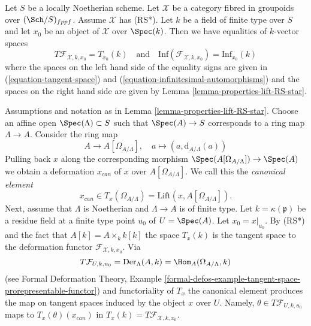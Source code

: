 \begin{remark}
\label{remark-compare-deformation-spaces}
Let $S$ be a locally Noetherian scheme. Let $\mathcal{X}$ be a category fibred
in groupoids over $(\Sch/S)_{fppf}$. Assume $\mathcal{X}$ has (RS*).
Let $k$ be a field of finite type over $S$ and let $x_0$ be an object of
$\mathcal{X}$ over $\Spec(k)$. Then we have equalities of
$k$-vector spaces
$$
T\mathcal{F}_{\mathcal{X}, k, x_0} = T_{x_0}(k)
\quad\text{and}\quad
\text{Inf}(\mathcal{F}_{\mathcal{X}, k, x_0}) =
\text{Inf}_{x_0}(k)
$$
where the spaces on the left hand side of the equality signs are
given in (\ref{equation-tangent-space}) and
(\ref{equation-infinitesimal-automorphisms})
and the spaces on the right hand side are given by
Lemma \ref{lemma-properties-lift-RS-star}.
\end{remark}

\begin{remark}
\label{remark-canonical-element}
Assumptions and notation as in Lemma \ref{lemma-properties-lift-RS-star}.
Choose an affine open $\Spec(\Lambda) \subset S$ such that $\Spec(A) \to S$
corresponds to a ring map $\Lambda \to A$. Consider the ring map
$$
A \longrightarrow A[\Omega_{A/\Lambda}],
\quad
a \longmapsto (a, \text{d}_{A/\Lambda}(a))
$$
Pulling back $x$ along the corresponding morphism
$\Spec(A[\Omega_{A/\Lambda}]) \to \Spec(A)$ we obtain a
deformation $x_{can}$ of $x$ over $A[\Omega_{A/\Lambda}]$. We call this
the {\it canonical element}
$$
x_{can} \in T_x(\Omega_{A/\Lambda}) = \text{Lift}(x, A[\Omega_{A/\Lambda}]).
$$
Next, assume that $\Lambda$ is Noetherian and $\Lambda \to A$
is of finite type. Let
$k = \kappa(\mathfrak p)$ be a residue field at a finite type point $u_0$
of $U = \Spec(A)$. Let $x_0 = x|_{u_0}$. By (RS*) and the fact that
$A[k] = A \times_k k[k]$ the space $T_x(k)$ is the tangent space to the
deformation functor $\mathcal{F}_{\mathcal{X}, k, x_0}$. Via
$$
T\mathcal{F}_{U, k, u_0} =
\text{Der}_\Lambda(A, k) = \Hom_A(\Omega_{A/\Lambda}, k)
$$
(see Formal Deformation Theory, Example
\ref{formal-defos-example-tangent-space-prorepresentable-functor})
and functoriality of $T_x$ the canonical element produces the map
on tangent spaces induced by the object $x$ over $U$. Namely,
$\theta \in T\mathcal{F}_{U, k, u_0}$ maps to $T_x(\theta)(x_{can})$
in $T_x(k) = T\mathcal{F}_{\mathcal{X}, k, x_0}$.
\end{remark}

